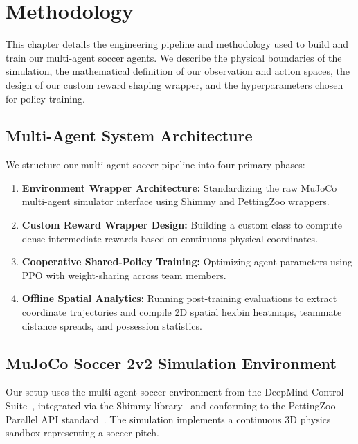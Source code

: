 \chapter{Methodology}
\label{ch:method}

This chapter details the engineering pipeline and methodology used to build and train our multi-agent soccer agents. We describe the physical boundaries of the simulation, the mathematical definition of our observation and action spaces, the design of our custom reward shaping wrapper, and the hyperparameters chosen for policy training.

\section{Multi-Agent System Architecture}
\label{sec:method_design}

We structure our multi-agent soccer pipeline into four primary phases:

\begin{enumerate}
    \item \textbf{Environment Wrapper Architecture:} Standardizing the raw MuJoCo multi-agent simulator interface using Shimmy and PettingZoo wrappers.
    \item \textbf{Custom Reward Wrapper Design:} Building a custom class to compute dense intermediate rewards based on continuous physical coordinates.
    \item \textbf{Cooperative Shared-Policy Training:} Optimizing agent parameters using PPO with weight-sharing across team members.
    \item \textbf{Offline Spatial Analytics:} Running post-training evaluations to extract coordinate trajectories and compile 2D spatial hexbin heatmaps, teammate distance spreads, and possession statistics.
\end{enumerate}

\section{MuJoCo Soccer 2v2 Simulation Environment}
\label{sec:method_soccer_env}

Our setup uses the multi-agent soccer environment from the DeepMind Control Suite~\citep{tassa2020dmcontrol}, integrated via the Shimmy library~\citep{shimmy2022} and conforming to the PettingZoo Parallel API standard~\citep{terry2021pettingzoo}. The simulation implements a continuous 3D physics sandbox representing a soccer pitch.

